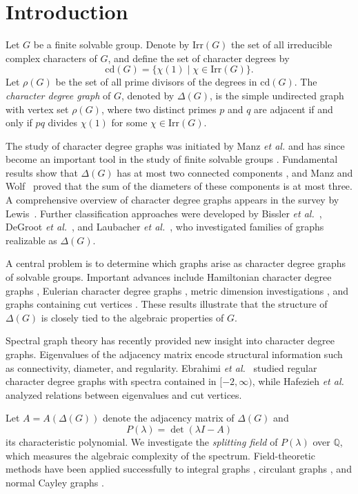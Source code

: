 \documentclass[11pt]{amsart}
\newcommand{\Irr}{\mathrm{Irr}}
\newcommand{\cd}{\mathrm{cd}}
\begin{document}
\section{Introduction}


Let $G$ be a finite solvable group. Denote by $\Irr(G)$ the set of all irreducible complex characters of $G$, and define the set of character degrees by
\[
\cd(G)=\{\chi(1)\mid \chi\in\Irr(G)\}.
\]
Let $\rho(G)$ be the set of all prime divisors of the degrees in $\cd(G)$. The \emph{character degree graph} of $G$, denoted by $\Delta(G)$, is the simple undirected graph with vertex set $\rho(G)$, where two distinct primes $p$ and $q$ are adjacent if and only if $pq$ divides $\chi(1)$ for some $\chi\in\Irr(G)$.

The study of character degree graphs was initiated by Manz \emph{et al.} and has since become an important tool in the study of finite solvable groups \cite{ManzStaszewski1988}. Fundamental results show that $\Delta(G)$ has at most two connected components \cite{Manz1985}, and Manz and Wolf~\cite{ManzWolf1989} proved that the sum of the diameters of these components is at most three. A comprehensive overview of character degree graphs appears in the survey by Lewis~\cite{Lewis2008}. Further classification approaches were developed by Bissler \emph{et al.}~\cite{Bissler2019b,Bissler2025}, DeGroot \emph{et al.}~\cite{LJ}, and Laubacher \emph{et al.}~\cite{LM, LMS}, who investigated families of graphs realizable as $\Delta(G)$.

A central problem is to determine which graphs arise as character degree graphs of solvable groups. Important advances include Hamiltonian character degree graphs \cite{Ebrahimi2015}, Eulerian character degree graphs \cite{Sivanesan2024}, metric dimension investigations \cite{Cameron2025}, and graphs containing cut vertices \cite{Hafezieh2021}. These results illustrate that the structure of $\Delta(G)$ is closely tied to the algebraic properties of $G$.

Spectral graph theory has recently provided new insight into character degree graphs. Eigenvalues of the adjacency matrix encode structural information such as connectivity, diameter, and regularity. Ebrahimi \emph{et al.}~\cite{Ebrahimi2023} studied regular character degree graphs with spectra contained in $[-2,\infty)$, while Hafezieh \emph{et al.}~\cite{Hafezieh2021} analyzed relations between eigenvalues and cut vertices.

Let $A=A(\Delta(G))$ denote the adjacency matrix of $\Delta(G)$ and
\[
P(\lambda)=\det(\lambda I-A)
\]
its characteristic polynomial. We investigate the \emph{splitting field} of $P(\lambda)$ over $\mathbb{Q}$, which measures the algebraic complexity of the spectrum. Field-theoretic methods have been applied successfully to integral graphs \cite{Harary1974}, circulant graphs \cite{Monius2022}, and normal Cayley graphs \cite{Wu2024}.
\end{document}
